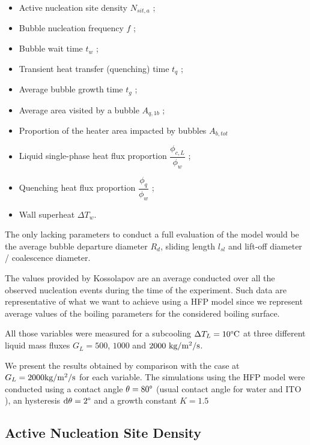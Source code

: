 \begin{itemize}
\item Active nucleation site density $N_{sit,a}$ ;
\item Bubble nucleation frequency $f$ ;
\item Bubble wait time $t_{w}$ ;
\item Transient heat transfer (quenching) time $t_{q}$ ;
\item Average bubble growth time $t_{g}$ ;
\item Average area visited by a bubble $A_{q,1b}$ ;
\item Proportion of the heater area impacted by bubbles $A_{b,tot}$
\item Liquid single-phase heat flux proportion $\dfrac{\phi_{c,L}}{\phi_{w}}$ ;
\item Quenching heat flux proportion $\dfrac{\phi_{q}}{\phi_{w}}$ ;
\item Wall superheat $\Delta T_{w}$.
\end{itemize}

The only lacking parameters to conduct a full evaluation of the model would be the average bubble departure diameter $R_{d}$, sliding length $l_{sl}$ and lift-off diameter / coalescence diameter.

The values provided by Kossolapov are an average conducted over all the observed nucleation events during the time of the experiment. Such data are representative of what we want to achieve using a HFP model since we represent average values of the boiling parameters for the considered boiling surface.

\npar

All those variables were measured for a subcooling $\Delta T_{L} = 10\degree\mathrm{C}$ at three different liquid mass fluxes $G_{L} = 500$, $1000$ and $2000~\text{kg/m$^{2}$/s}$. 

\npar

We present the results obtained by comparison with the case at $G_{L} = 2000 \text{kg/m$^{2}$/s}$ for each variable. The simulations using the HFP model were conducted using a contact angle $\theta = 80 \degree$ (usual contact angle for water and ITO \cite{kossolapov_experimental_2021}), an hysteresis $\mathrm{d}\theta = 2 \degree$ and a growth constant $K=1.5$

 
\subsection{Active Nucleation Site Density}

